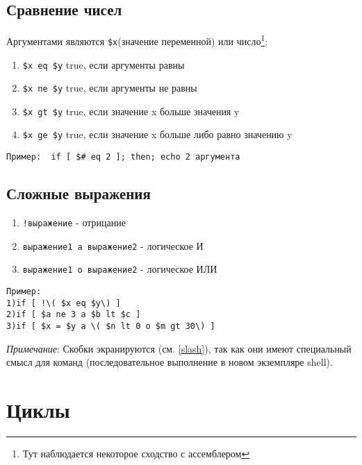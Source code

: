 \subsection{Сравнение чисел}

Аргументами являются \verb+$x+(значение переменной) или число\footnote{Тут наблюдается некоторое сходство с ассемблером}:
\begin{enumerate}
\item \verb+$x eq $y+   true, если аргументы равны
\item \verb+$x ne $y+  true, если аргументы не равны
\item \verb+$x gt $y+  true, если значение x больше значения y 
\item \verb+$x ge $y+  true, если значение x больше либо равно значению y
\end{enumerate}

\verb+Пример:  if [ $# eq 2 ]; then; echo 2 аргумента +

\subsection{Сложные выражения}

\begin{enumerate}
\item \verb+!выражение+	- отрицание
\item \verb+выражение1 a выражение2+	- логическое И
\item \verb+выражение1 o выражение2+	- логическое ИЛИ
\end{enumerate}
\begin{verbatim}
Пример: 
1)if [ !\( $x eq $y\) ]
2)if [ $a ne 3 a $b lt $c ]
3)if [ $x = $y a \( $n lt 0 o $m gt 30\) ]
\end{verbatim}
\emph{Примечание}: Скобки экранируются (см. \ref{slash}), так как они имеют специальный смысл для команд (последовательное выполнение в новом экземпляре shell).


\section{Циклы}

